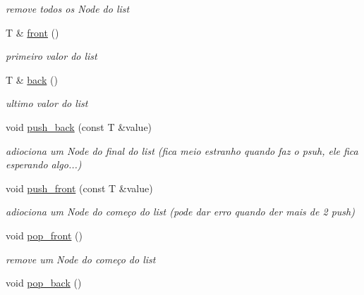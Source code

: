 \begin{DoxyCompactItemize}
\begin{DoxyCompactList}\small\item\em remove todos os Node do list \end{DoxyCompactList}\item 
T \& \hyperlink{classsc_1_1list_af4e92039ed6cfe0a4137397a5a1226b2}{front} ()
\begin{DoxyCompactList}\small\item\em primeiro valor do list \end{DoxyCompactList}\item 
T \& \hyperlink{classsc_1_1list_a5c3298ec08c16141dcc73425e6b3ad18}{back} ()
\begin{DoxyCompactList}\small\item\em ultimo valor do list \end{DoxyCompactList}\item 
void \hyperlink{classsc_1_1list_a1d77cdaeacca7959989873617a753c96}{push\+\_\+back} (const T \&value)
\begin{DoxyCompactList}\small\item\em adiociona um Node do final do list (fica meio estranho quando faz o psuh, ele fica esperando algo...) \end{DoxyCompactList}\item 
void \hyperlink{classsc_1_1list_a24a7b8a81765dfe0351ddb263bc6d754}{push\+\_\+front} (const T \&value)
\begin{DoxyCompactList}\small\item\em adiociona um Node do começo do list (pode dar erro quando der mais de 2 push) \end{DoxyCompactList}\item 
void \hyperlink{classsc_1_1list_ab3fbf66643f4356cf0c1947bd4fdf48e}{pop\+\_\+front} ()\hypertarget{classsc_1_1list_ab3fbf66643f4356cf0c1947bd4fdf48e}{}\label{classsc_1_1list_ab3fbf66643f4356cf0c1947bd4fdf48e}

\begin{DoxyCompactList}\small\item\em remove um Node do começo do list \end{DoxyCompactList}\item 
void \hyperlink{classsc_1_1list_a3d6fc0a4f2c1db7c74af5a482c1a03ca}{pop\+\_\+back} ()\hypertarget{classsc_1_1list_a3d6fc0a4f2c1db7c74af5a482c1a03ca}{}\label{classsc_1_1list_a3d6fc0a4f2c1db7c74af5a482c1a03ca}


\end{DoxyCompactItemize}
